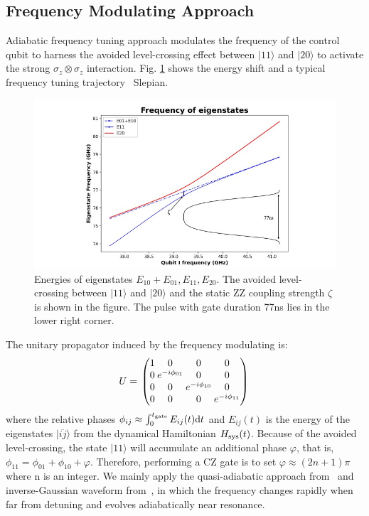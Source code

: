 \documentclass[conference, 9pt]{IEEEtran}
\begin{document}
\subsection{Frequency Modulating Approach}
Adiabatic frequency tuning approach modulates the frequency of the control qubit to harness the avoided level-crossing effect between $|11\rangle$ and $|20\rangle$ to activate the strong $\sigma_z\otimes \sigma_z$ interaction. Fig. \ref{fig:czgate} shows the energy shift  and a typical frequency tuning trajectory \textemdash \ Slepian.
\begin{figure}
    \centering
   
   \includegraphics[width = .90\linewidth]{Figures/energy.jpg}
    \caption{Energies of eigenstates $E_{10}+E_{01}, E_{11}, E_{20}$. The avoided level-crossing between $|11\rangle$ and $|20\rangle$ and the static ZZ coupling strength $\zeta$ is shown in the figure. The pulse with gate duration 77ns lies in the lower right corner.}
    \label{fig:czgate}
\end{figure}
The unitary propagator induced by the frequency modulating is:
 \begin{align}
    \setlength{\arraycolsep}{1.2pt}
    U = \begin{array}{lc}
    \begin{pmatrix}
    1 & 0 & 0 & 0  \\
    0 & e^{-i\phi_{01}} & 0 & 0 \\
    0 & 0 & e^{-i\phi_{10}} & 0 \\
    0 & 0 & 0 & e^{-i\phi_{11}} \\
    \end{pmatrix}
    \end{array}
    \end{align}
where the relative phases $\phi_{ij} \approx \int_{0}^{t_{\rm{gate}}}E_{ij}(t) \text{d}t$ and $E_{ij}(t)$ is the energy of the eigenstates $|\overline{ij}\rangle$ from the dynamical Hamiltonian $H_{\rm{sys}}(t)$. Because of the avoided level-crossing, the state $|11\rangle$ will accumulate an additional phase $\varphi$, that is, $\phi_{11} = \phi_{01}+\phi_{10} + \varphi$. Therefore,  performing a CZ gate is to set $\varphi \approx (2n+1)\pi$ where n is an integer. We mainly apply the quasi-adiabatic approach from~\cite{Martinis_2014} and inverse-Gaussian waveform from~\cite{PhysRevA.87.022309}, in which the frequency changes rapidly when far from detuning and evolves adiabatically near resonance. 
\end{document}

